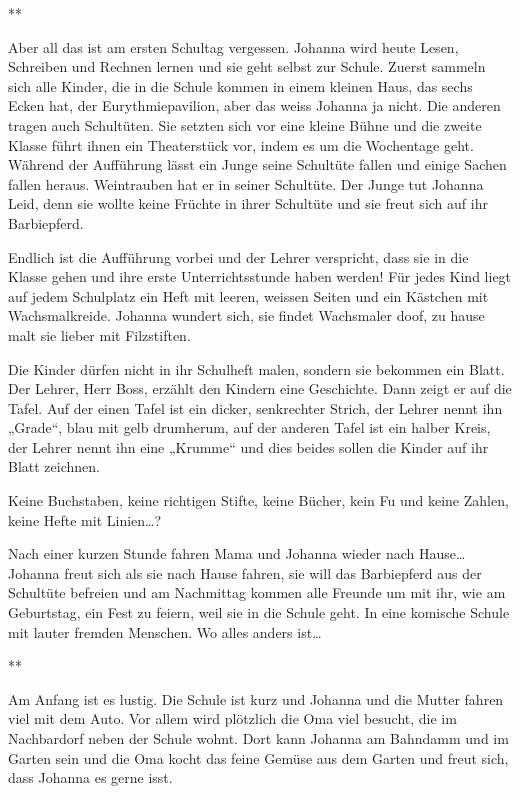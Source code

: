 \documentclass[10pt,titlepage,a5paper]{book}
\newcommand{\sterne}{\par{\centering ***\par}}
\begin{document}
\sterne

Aber all das ist am ersten Schultag vergessen. Johanna wird heute Lesen, Schreiben und Rechnen lernen und sie geht selbst zur Schule.
Zuerst sammeln sich alle Kinder, die in  die Schule kommen in einem kleinen Haus, das sechs Ecken hat, der Eurythmiepavilion, aber das weiss Johanna ja nicht. Die anderen tragen auch Schultüten. Sie setzten sich vor eine kleine Bühne und die zweite Klasse führt ihnen ein Theaterstück vor, indem es um die Wochentage geht. Während der Aufführung lässt ein Junge seine Schultüte fallen und einige Sachen fallen heraus. Weintrauben hat er in seiner Schultüte. Der Junge tut Johanna Leid, denn sie wollte keine Früchte in ihrer Schultüte und sie freut sich auf ihr Barbiepferd.

Endlich ist die Aufführung vorbei und der Lehrer verspricht, dass sie in die Klasse gehen und ihre erste Unterrichtsstunde haben werden! Für jedes Kind liegt auf jedem Schulplatz ein Heft mit leeren, weissen Seiten und ein Kästchen mit Wachsmalkreide. Johanna wundert sich, sie findet Wachsmaler doof, zu hause malt sie lieber mit Filzstiften. 

Die Kinder dürfen nicht in ihr Schulheft malen, sondern sie bekommen ein Blatt. Der Lehrer, Herr Boss, erzählt den Kindern eine Geschichte. Dann zeigt er auf die Tafel. Auf der einen Tafel ist ein dicker, senkrechter Strich, der Lehrer nennt ihn „Grade“, blau mit gelb drumherum, auf der anderen Tafel ist ein halber Kreis, der Lehrer nennt ihn eine „Krumme“ und dies beides sollen die Kinder auf ihr Blatt zeichnen.

Keine Buchstaben, keine richtigen Stifte, keine Bücher, kein Fu und keine Zahlen, keine Hefte mit Linien\dots?

Nach einer kurzen Stunde fahren Mama und Johanna wieder nach Hause\dots
Johanna freut sich als sie nach Hause fahren, sie will das Barbiepferd aus der Schultüte befreien und am Nachmittag kommen alle Freunde um mit ihr, wie am Geburtstag, ein Fest zu feiern, weil sie in die Schule geht. In eine komische Schule mit lauter fremden Menschen. Wo alles anders ist\dots


\sterne


Am Anfang ist es lustig. Die Schule ist kurz und Johanna und die Mutter fahren viel mit dem Auto. Vor allem wird plötzlich die Oma viel besucht, die im Nachbardorf neben der Schule wohnt. Dort kann Johanna am Bahndamm und im Garten sein und die Oma kocht das feine Gemüse aus dem Garten und freut sich, dass Johanna es gerne isst.
\end{document}

